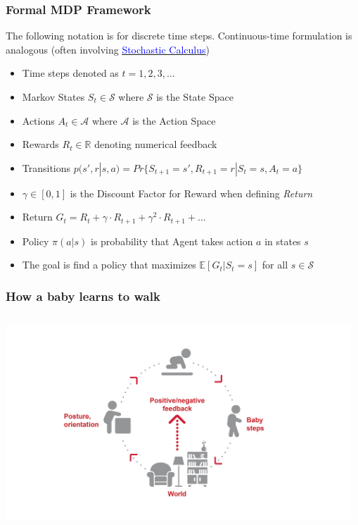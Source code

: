 \documentclass[handout]{beamer}
\begin{document}
\begin{frame}
\frametitle{Formal MDP Framework}
\pause
The following notation is for discrete time steps. Continuous-time formulation is analogous (often involving
\href{https://github.com/coverdrive/technical-documents/blob/master/finance/cme241/StochasticCalculusFoundations.pdf}{\underline{\textcolor{blue}{Stochastic Calculus}}})
\begin{itemize}[<+->]
\item Time steps denoted as $t = 1, 2, 3, \ldots$
\item Markov States $S_t \in \mathcal{S}$ where $\mathcal{S}$ is the State Space
\item Actions $A_t \in \mathcal{A}$ where $\mathcal{A}$ is the Action Space
\item Rewards $R_t \in \mathbb{R}$ denoting numerical feedback\
\item Transitions $p(s',r|s,a) = Pr\{S_{t+1}=s',R_{t+1}=r|S_t=s,A_t=a\}$
\item $\gamma \in [0,1]$ is the Discount Factor for Reward when defining {\em Return}
\item Return $G_t = R_t + \gamma \cdot R_{t+1} + \gamma^2 \cdot R_{t+1} + \ldots$
\item Policy $\pi(a|s)$ is probability that Agent takes action $a$ in states $s$
\item The goal is find a policy that maximizes  $\mathbb{E}[G_t|S_t = s]$ for all $s \in \mathcal{S}$
\end{itemize}
\end{frame}

\begin{frame}
\frametitle{How a baby learns to walk}
\includegraphics[width=13cm, height=8cm]{BabyMDP.jpg}
\end{frame}
\end{document}
